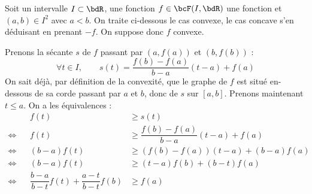 \documentclass[a4paper,french,bookmarks]{report}
\begin{document}
\begin{nproof}
    Soit un intervalle $I \subset \bdR$, une fonction $f \in \bcF(I, \bdR)$ une fonction et $(a, b) \in I^2$ avec $a < b$. On traite ci-dessous le cas convexe, le cas concave s'en déduisant en prenant $-f$. On suppose donc $f$ convexe.
    
    \begin{minipage}{0.55\linewidth}
        Prenons la sécante $s$ de $f$ passant par $\left(a, f(a)\right)$ et $\left(b, f(b)\right)$ :
        \[ \forall t \in I,\qquad s(t) = \dfrac{f(b)-f(a)}{b-a}(t-a) + f(a)\]
        On sait déjà, par définition de la convexité, que le graphe de $f$ est situé en-dessous de sa corde passant par $a$ et $b$, donc de $s$ sur $[a, b]$. Prenons maintenant $t \leq a$. On a les équivalences :
        \begin{align*} 
            && f(t) &\geq s(t)\\
            \iff&& f(t) &\geq \dfrac{f(b)-f(a)}{b-a}(t-a) + f(a)\\
            \iff&& (b-a)f(t) &\geq \left(f(b)-f(a)\right)(t-a) + (b-a)f(a)\\
            \iff&& (b-a)f(t) &\geq (t-a)f(b) + (b-t)f(a)\\
            \iff&& \dfrac{b-a}{b-t}f(t) + \dfrac{a-t}{b-t}f(b) &\geq f(a)
        \end{align*}
    \end{minipage}
    \hfill
    \begin{minipage}{0.4\linewidth}
        \pgfplotsset{width=\linewidth}
\end{minipage}
\end{nproof}
\end{document}

